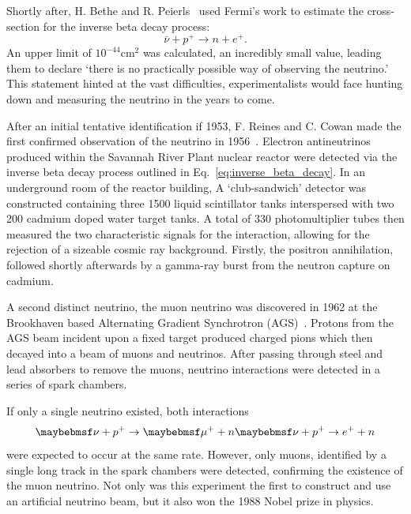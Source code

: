 Shortly after, H. Bethe and R. Peierls~\cite{bethe1934} used Fermi's work to estimate the
cross-section for the inverse beta decay process:
\begin{equation} %
    \bar{\nu} + p^{+} \rightarrow n + e^{+}.
    \label{eq:inverse_beta_decay}
\end{equation}
An upper limit of $10^{-44} \mathrm{cm}^2$ was calculated, an incredibly small value, leading them
to declare `there is no practically possible way of observing the neutrino.' This statement hinted
at the vast difficulties, experimentalists would face hunting down and measuring the neutrino in
the years to come.

After an initial tentative identification if 1953, F. Reines and C. Cowan made the first confirmed
observation of the neutrino in 1956~\cite{cowan1956}. Electron antineutrinos produced within the
Savannah River Plant nuclear reactor were detected via the inverse beta decay process outlined in
Eq.~\ref{eq:inverse_beta_decay}. In an underground room of the reactor building, A `club-sandwich'
detector was constructed containing three \unit{1500}{\litre} liquid scintillator tanks
interspersed with two \unit{200}{\litre} cadmium doped water target tanks. A total of 330
photomultiplier tubes then measured the two characteristic signals for the interaction, allowing
for the rejection of a sizeable cosmic ray background. Firstly, the positron annihilation,
followed shortly afterwards by a gamma-ray burst from the neutron capture on cadmium.

A second distinct neutrino, the muon neutrino was discovered in 1962 at the Brookhaven based
Alternating Gradient Synchrotron (AGS)~\cite{danby1962}. Protons from the AGS beam incident upon a
fixed target produced charged pions which then decayed into a beam of muons and neutrinos. After
passing through steel and lead absorbers to remove the muons, neutrino interactions were detected
in a series of spark chambers.

If only a single neutrino existed, both interactions
\begin{equation} %
    \nu+p^{+}\rightarrow\mu^{+}+n \\
    \nu+p^{+}\rightarrow e^{+}+n
\end{equation}
were expected to occur at the same rate. However, only muons, identified by a single long track in
the spark chambers were detected, confirming the existence of the muon neutrino. Not only was this
experiment the first to construct and use an artificial neutrino beam, but it also won the 1988
Nobel prize in physics.

